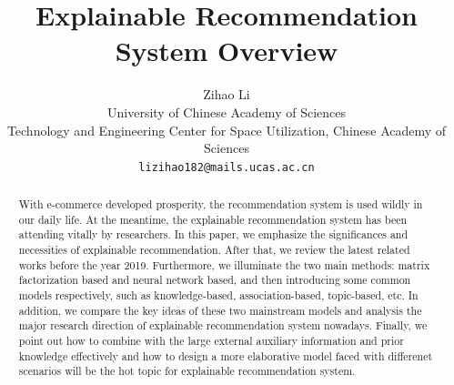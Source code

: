 \documentclass[10pt,twocolumn,letterpaper]{article}
\begin{document}
\title{Explainable Recommendation System Overview}

\author{Zihao Li\\
University of Chinese Academy of Sciences\\
Technology and Engineering Center for Space Utilization, Chinese Academy of Sciences\\ 
{\tt\small lizihao182@mails.ucas.ac.cn}
}

\maketitle

\begin{abstract}
   With e-commerce developed prosperity, the recommendation system is used wildly in our daily life. At the meantime, the explainable recommendation system has been attending vitally by researchers. In this paper, we emphasize the significances and necessities of explainable recommendation. After that, we review the latest related works before the year 2019. Furthermore, we illuminate the two main methods: matrix factorization based and neural network based, and then introducing some common models respectively, such as knowledge-based, association-based, topic-based, etc. In addition, we compare the key ideas of these two mainstream models and analysis the major research direction of explainable recommendation system nowadays. Finally, we point out how to combine with the large external auxiliary information and prior knowledge effectively and how to design a more elaborative model faced with differenet scenarios will be the hot topic for explainable recommendation system.
\end{abstract}

\end{document}
